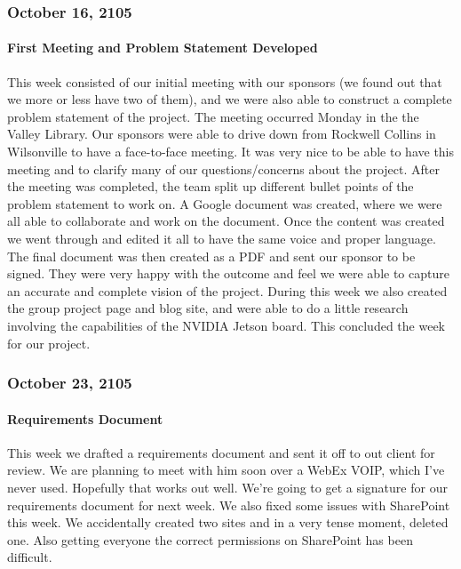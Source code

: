 \subsubsection{October 16, 2105}
\paragraph{First Meeting and Problem Statement Developed}
This week consisted of our initial meeting with our sponsors (we found out that we more or less have two of them), and we were also able to construct a complete problem statement of the project. The meeting occurred Monday in the the Valley Library. Our sponsors were able to drive down from Rockwell Collins in Wilsonville to have a face-to-face meeting. It was very nice to be able to have this meeting and to clarify many of our questions/concerns about the project. After the meeting was completed, the team split up different bullet points of the problem statement to work on. A Google document was created, where we were all able to collaborate and work on the document. Once the content was created we went through and edited it all to have the same voice and proper language. The final document was then created as a PDF and sent our sponsor to be signed. They were very happy with the outcome and feel we were able to capture an accurate and complete vision of the project. During this week we also created the group project page and blog site, and were able to do a little research involving the capabilities of the NVIDIA Jetson board. This concluded the week for our project.\\

\subsubsection{October 23, 2105}
\paragraph{Requirements Document}
This week we drafted a requirements document and sent it off to out client for review. We are planning to meet with him soon over a WebEx VOIP, which I've never used. Hopefully that works out well. We're going to get a signature for our requirements document for next week. We also fixed some issues with SharePoint this week. We accidentally created two sites and in a very tense moment, deleted one. Also getting everyone the correct permissions on SharePoint has been difficult.\\

